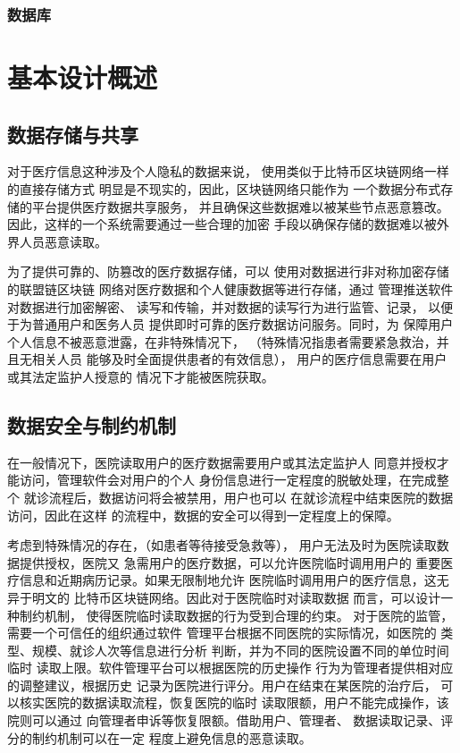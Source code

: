 \documentclass[UTF8]{ctexart}
\begin{document}
    \subsubsection{数据库}    

    \section{基本设计概述}
    \subsection{数据存储与共享}
    \par
    对于医疗信息这种涉及个人隐私的数据来说，
    使用类似于比特币区块链网络一样的直接存储方式
    明显是不现实的，因此，区块链网络只能作为
    一个数据分布式存储的平台提供医疗数据共享服务，
    并且确保这些数据难以被某些节点恶意篡改。
    因此，这样的一个系统需要通过一些合理的加密
    手段以确保存储的数据难以被外界人员恶意读取。
    \par
    为了提供可靠的、防篡改的医疗数据存储，可以
    使用对数据进行非对称加密存储的联盟链区块链
    网络对医疗数据和个人健康数据等进行存储，通过
    管理推送软件对数据进行加密解密、
    读写和传输，并对数据的读写行为进行监管、记录，
    以便于为普通用户和医务人员
    提供即时可靠的医疗数据访问服务。同时，为
    保障用户个人信息不被恶意泄露，在非特殊情况下，
    （特殊情况指患者需要紧急救治，并且无相关人员
    能够及时全面提供患者的有效信息），
    用户的医疗信息需要在用户或其法定监护人授意的
    情况下才能被医院获取。
    \subsection{数据安全与制约机制}
    \par
    在一般情况下，医院读取用户的医疗数据需要用户或其法定监护人
    同意并授权才能访问，管理软件会对用户的个人
    身份信息进行一定程度的脱敏处理，在完成整个
    就诊流程后，数据访问将会被禁用，用户也可以
    在就诊流程中结束医院的数据访问，因此在这样
    的流程中，数据的安全可以得到一定程度上的保障。
    
    \par
    考虑到特殊情况的存在，（如患者等待接受急救等），
    用户无法及时为医院读取数据提供授权，医院又
    急需用户的医疗数据，可以允许医院临时调用用户的
    重要医疗信息和近期病历记录。如果无限制地允许
    医院临时调用用户的医疗信息，这无异于明文的
    比特币区块链网络。因此对于医院临时对读取数据
    而言，可以设计一种制约机制，
    使得医院临时读取数据的行为受到合理的约束。
    对于医院的监管，需要一个可信任的组织通过软件
    管理平台根据不同医院的实际情况，如医院的
    类型、规模、就诊人次等信息进行分析
    判断，并为不同的医院设置不同的单位时间临时
    读取上限。软件管理平台可以根据医院的历史操作
    行为为管理者提供相对应的调整建议，根据历史
    记录为医院进行评分。用户在结束在某医院的治疗后，
    可以核实医院的数据读取流程，恢复医院的临时
    读取限额，用户不能完成操作，该院则可以通过
    向管理者申诉等恢复限额。借助用户、管理者、
    数据读取记录、评分的制约机制可以在一定
    程度上避免信息的恶意读取。
\end{document}
